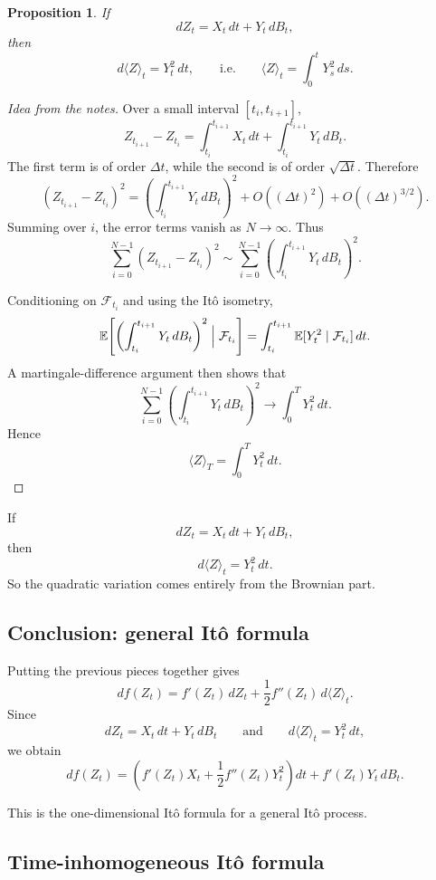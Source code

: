 \documentclass[11pt]{article}
\newtheorem{proposition}[theorem]{Proposition}
\theoremstyle{definition}
\begin{document}
\begin{proposition}
If
\[
dZ_t=X_t\,dt+Y_t\,dB_t,
\]
then
\[
d\langle Z\rangle_t=Y_t^2\,dt,
\qquad\text{i.e.}\qquad
\langle Z\rangle_t=\int_0^t Y_s^2\,ds.
\]
\end{proposition}

\begin{proof}[Idea from the notes]
Over a small interval \([t_i,t_{i+1}]\),
\[
Z_{t_{i+1}}-Z_{t_i}
=
\int_{t_i}^{t_{i+1}} X_t\,dt
+
\int_{t_i}^{t_{i+1}} Y_t\,dB_t.
\]
The first term is of order \(\Delta t\), while the second is of order \(\sqrt{\Delta t}\). Therefore
\[
(Z_{t_{i+1}}-Z_{t_i})^2
=
\left(\int_{t_i}^{t_{i+1}} Y_t\,dB_t\right)^2
+
O((\Delta t)^2)
+
O((\Delta t)^{3/2}).
\]
Summing over \(i\), the error terms vanish as \(N\to\infty\). Thus
\[
\sum_{i=0}^{N-1}(Z_{t_{i+1}}-Z_{t_i})^2
\sim
\sum_{i=0}^{N-1}
\left(\int_{t_i}^{t_{i+1}}Y_t\,dB_t\right)^2.
\]

Conditioning on \(\mathcal F_{t_i}\) and using the It\^o isometry,
\[
\mathbb E\!\left[
\left(\int_{t_i}^{t_{i+1}}Y_t\,dB_t\right)^2
\Bigm|\mathcal F_{t_i}
\right]
=
\int_{t_i}^{t_{i+1}}\mathbb E[Y_t^2\mid \mathcal F_{t_i}]\,dt.
\]
A martingale-difference argument then shows that
\[
\sum_{i=0}^{N-1}
\left(\int_{t_i}^{t_{i+1}}Y_t\,dB_t\right)^2
\to
\int_0^T Y_t^2\,dt.
\]
Hence
\[
\langle Z\rangle_T=\int_0^T Y_t^2\,dt.
\]
\end{proof}

\begin{keyformula}
If
\[
dZ_t=X_t\,dt+Y_t\,dB_t,
\]
then
\[
d\langle Z\rangle_t=Y_t^2\,dt.
\]
So the quadratic variation comes entirely from the Brownian part.
\end{keyformula}

\subsection{Conclusion: general It\^o formula}

Putting the previous pieces together gives
\[
df(Z_t)
=
f'(Z_t)\,dZ_t+\frac12 f''(Z_t)\,d\langle Z\rangle_t.
\]
Since
\[
dZ_t=X_t\,dt+Y_t\,dB_t
\qquad\text{and}\qquad
d\langle Z\rangle_t=Y_t^2\,dt,
\]
we obtain
\[
df(Z_t)
=
\left(f'(Z_t)X_t+\frac12 f''(Z_t)Y_t^2\right)dt
+
f'(Z_t)Y_t\,dB_t.
\]

This is the one-dimensional It\^o formula for a general It\^o process.

\subsection{Time-inhomogeneous It\^o formula}
\end{document}
